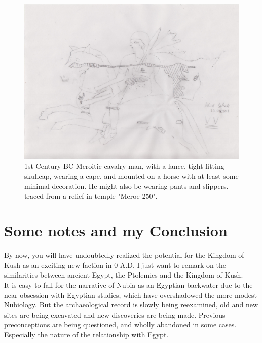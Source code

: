 \documentclass[a4paper,12pt]{scrreprt}
\begin{document}
\begin{figure}[H]
	\centering
	\includegraphics[width=\textwidth]{img/kushite_cavalry/sketch_meroitic_cavalry_man}
	\caption{1st Century BC Meroitic cavalry man, with a lance, tight fitting skullcap, wearing a cape, and mounted on a horse with at least some minimal decoration. He might also be wearing pants and slippers. traced from a relief in temple "Meroe 250".}
\end{figure}

\section{Some notes and my Conclusion}

By now, you will have undoubtedly realized the potential for the Kingdom of Kush as an exciting new faction in 0 A.D. I just want to remark on the similarities between ancient Egypt, the Ptolemies and the Kingdom of Kush.\\ 

It is easy to fall for the narrative of Nubia as an Egyptian backwater due to the near obsession with Egyptian studies, which have overshadowed the more modest Nubiology. But the archaeological record is slowly being reexamined, old and new sites are being excavated and new discoveries are being made. Previous preconceptions are being questioned, and wholly abandoned in some cases. Especially the nature of the relationship with Egypt.\\ 
\end{document}
